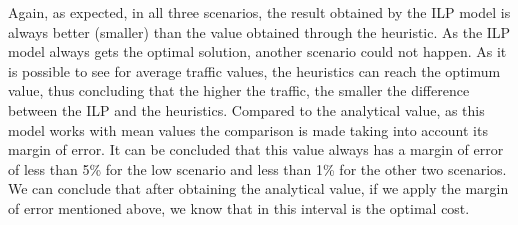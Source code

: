 \vspace{13pt}
Again, as expected, in all three scenarios, the result obtained by the ILP model is always better (smaller) than the value obtained through the heuristic. As the ILP model always gets the optimal solution, another scenario could not happen. As it is possible to see for average traffic values, the heuristics can reach the optimum value, thus concluding that the higher the traffic, the smaller the difference between the ILP and the heuristics. Compared to the analytical value, as this model works with mean values the comparison is made taking into account its margin of error. It can be concluded that this value always has a margin of error of less than 5\% for the low scenario and less than 1\% for the other two scenarios. We can conclude that after obtaining the analytical value, if we apply the margin of error mentioned above, we know that in this interval is the optimal cost.
